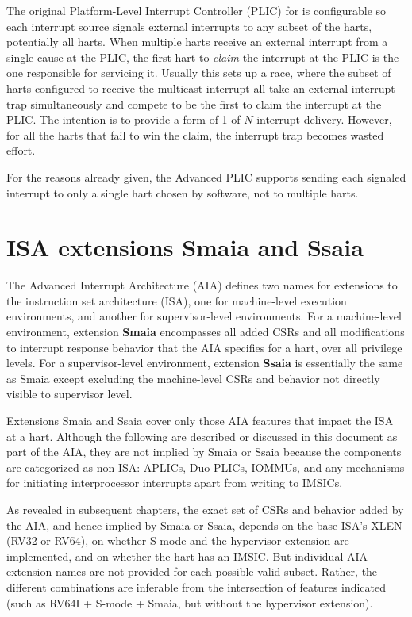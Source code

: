 \begin{commentary}
The original Platform-Level Interrupt Controller (PLIC) for {\RISCV}
is configurable so each interrupt source signals external interrupts to
any subset of the harts, potentially all harts.
When multiple harts receive an external interrupt from a single cause
at the PLIC, the first hart to \emph{claim} the interrupt at the PLIC
is the one responsible for servicing it.
Usually this sets up a race, where the subset of harts configured to
receive the multicast interrupt all take an external interrupt trap
simultaneously and compete to be the first to claim the interrupt at
the PLIC.
The intention is to provide a form of \mbox{1-of-$N$} interrupt
delivery.
However, for all the harts that fail to win the claim, the interrupt
trap becomes wasted effort.

For the reasons already given, the Advanced PLIC supports sending each
signaled interrupt to only a single hart chosen by software, not to
multiple harts.
\end{commentary}

\section{ISA extensions Smaia and Ssaia}

The Advanced Interrupt Architecture (AIA) defines two names for
extensions to the {\RISCV} instruction set architecture (ISA),
one for machine-level execution environments,
and another for supervisor-level environments.
For a machine-level environment, extension \textbf{Smaia} encompasses
all added CSRs and all modifications to interrupt response behavior
that the AIA specifies for a hart, over all privilege levels.
For a supervisor-level environment, extension \textbf{Ssaia} is
essentially the same as Smaia except excluding the machine-level
CSRs and behavior not directly visible to supervisor level.

Extensions Smaia and Ssaia cover only
those AIA features that impact the ISA at a hart.
Although the following are described or discussed
in this document as part of the AIA, they are not implied by
Smaia or Ssaia because the components are categorized as non-ISA:
APLICs, Duo-PLICs, IOMMUs, and any mechanisms for initiating
interprocessor interrupts apart from writing to IMSICs.

As revealed in subsequent chapters, the exact set
of CSRs and behavior added by the AIA, and hence
implied by Smaia or Ssaia, depends on
the base ISA's XLEN (RV32 or RV64), on whether \mbox{S-mode}
and the hypervisor extension are implemented,
and on whether the hart has an IMSIC.
But individual AIA extension names are not
provided for each possible valid subset.
Rather, the different combinations are inferable
from the intersection of features indicated (such as
RV64I + \mbox{S-mode} + Smaia, but without the hypervisor extension).

